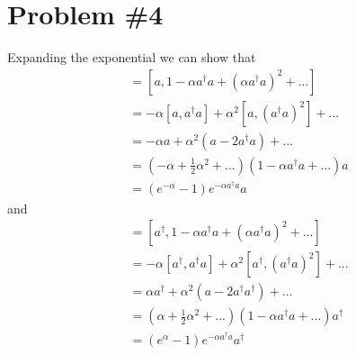 \documentclass[11pt]{article}
\numberwithin{equation}{section}
\begin{document}
\section{Problem \#4}
Expanding the exponential we can show that
\begin{align*}
    [a,e^{-\alpha{a^{\dagger}a}}] &= [a, 1 - \alpha{a^{\dagger}a} + (\alpha{a^{\dagger}a})^2+...]\\
                                  &=  - \alpha[a,a^{\dagger}a] + \alpha^2[a,(a^{\dagger}a)^2]+...\\
                                  &=  - \alpha{a} + \alpha^2(a-2a^{\dagger}a)+...\\
                                  &= \left(-\alpha + \frac{1}{2}\alpha^2 + ...\right)\left(1-\alpha{a^{\dagger}a}+...\right)a\\
                                  &= \left(e^{-\alpha}-1\right)e^{-\alpha{a^{\dagger}a}}a
\end{align*}
and
\begin{align*}
    [a^{\dagger},e^{-\alpha{a^{\dagger}a}}] &= [a^{\dagger}, 1 - \alpha{a^{\dagger}a} + (\alpha{a^{\dagger}a})^2+...]\\
                                  &=  - \alpha[a^{\dagger},a^{\dagger}a] + \alpha^2[a^{\dagger},(a^{\dagger}a)^2]+...\\
                                  &=  \alpha{a^{\dagger}} + \alpha^2(a-2a^{\dagger}a^{\dagger})+...\\
                                  &= \left(\alpha + \frac{1}{2}\alpha^2 + ...\right)\left(1-\alpha{a^{\dagger}a}+...\right)a^{\dagger}\\
                                  &= \left(e^{\alpha}-1\right)e^{-\alpha{a^{\dagger}a}}a^{\dagger}
\end{align*}
\end{document}
